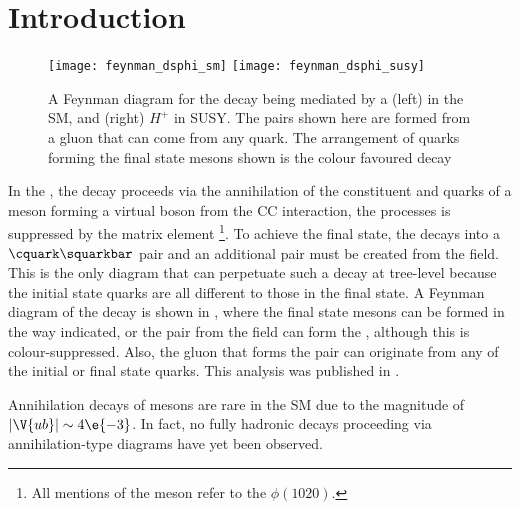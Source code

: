 \section{Introduction}

\begin{figure}[bh]
  \begin{center}
    \texttt{[image: feynman\_dsphi\_sm]}
    \texttt{[image: feynman\_dsphi\_susy]}
    \caption[Feynman diagram for the decay \btodsphi]
    {
      A Feynman diagram for the decay \btodsphi being mediated by a
      (left) \Wp in the SM, and
      (right) $H^+$ in SUSY.
      The \ssbar pairs shown here are formed from a gluon that can come from any quark.
      The arrangement of quarks forming the final state mesons shown is the colour favoured decay
    }
    \label{fig:dsphi:feyn}
  \end{center}
\end{figure}

In the \sm, the decay \btodsphi proceeds via the annihilation of the constituent \bquark and \uquark
quarks of a \Bp meson
forming a virtual \Wp boson from the \gls{CC} interaction, the processes is suppressed by the \ckm
matrix element \footnote{
  All mentions of the \phii meson refer to the $\phi(1020)$.
}.
To achieve the final state, the \Wp decays into a $\cquark\squarkbar$ pair and an additional
\ssbar pair must be created from the \QCD field.
This is the only diagram that can perpetuate such a decay at tree-level because the initial state
quarks are all different to those in the final state.
A Feynman diagram of the decay \btodsphi is shown in , where
the final state mesons can be formed in the way indicated, or the \ssbar pair from the \QCD field
can form the \phii, although this is colour-suppressed.
Also, the gluon that forms the \ssbar pair can originate from any of the initial or final state
quarks.
This analysis was published in .

Annihilation decays of \Bp mesons are rare in the SM due to the magnitude of
$|\V{ub}|\sim4\e{-3}$.
In fact, no fully hadronic decays proceeding via annihilation-type diagrams have yet been
observed.





